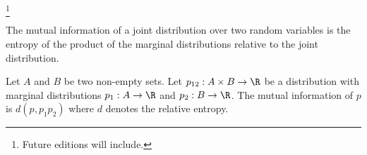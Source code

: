 
\footnote{Future editions will include.}


The mutual information of a joint distribution over two random variables is the entropy of the product of the marginal distributions relative to the joint distribution.


Let $A$ and $B$ be two non-empty sets.
Let $p_{12}: A \times B \to \R$ be a distribution with marginal distributions $p_1: A \to \R$ and $p_2: B \to \R$.
The mutual information of $p$ is $d(p,p_1p_2)$ where $d$ denotes the relative entropy.

\blankpage
